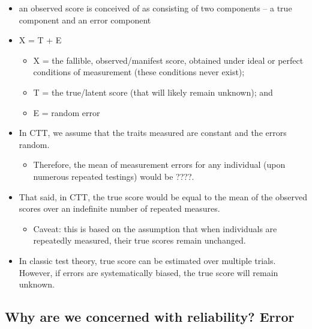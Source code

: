 \documentclass[
  english,
]{book}
\providecommand{\tightlist}{%
  \setlength{\itemsep}{0pt}\setlength{\parskip}{0pt}}
\begin{document}
\begin{itemize}
\tightlist
\item
  an observed score is conceived of as consisting of two components -- a true component and an error component
\item
  X = T + E

  \begin{itemize}
  \tightlist
  \item
    X = the fallible, observed/manifest score, obtained under ideal or perfect conditions of measurement (these conditions never exist);
  \item
    T = the true/latent score (that will likely remain unknown); and
  \item
    E = random error
  \end{itemize}
\item
  In CTT, we assume that the traits measured are constant and the errors random.

  \begin{itemize}
  \tightlist
  \item
    Therefore, the mean of measurement errors for any individual (upon numerous repeated testings) would be ????.
  \end{itemize}
\item
  That said, in CTT, the true score would be equal to the mean of the observed scores over an indefinite number of repeated measures.

  \begin{itemize}
  \tightlist
  \item
    Caveat: this is based on the assumption that when individuals are repeatedly measured, their true scores remain unchanged.
  \end{itemize}
\item
  In classic test theory, true score can be estimated over multiple trials. However, if errors are systematically biased, the true score will remain unknown.
\end{itemize}

\hypertarget{why-are-we-concerned-with-reliability-error}{%
\subsection{Why are we concerned with reliability? Error}\label{why-are-we-concerned-with-reliability-error}}
\end{document}
